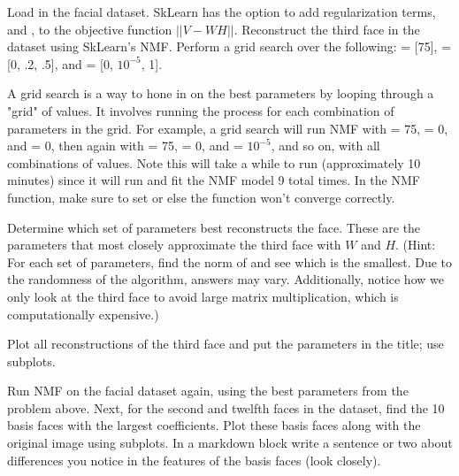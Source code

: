 \begin{problem}
Load in the facial dataset.
SkLearn has the option to add regularization terms,  and , to the objective function $||V-WH||$.
Reconstruct the third face in the dataset using SkLearn's NMF.
 Perform a grid search over the following:
 =  [75],  = [0, .2, .5], and  = [0, $10^{-5}$, 1]. 

A grid search is a way to hone in on the best parameters by looping through a "grid" of values. It involves running the process for each combination of parameters in the grid. For example, a grid search will run NMF with  =  75,  = 0, and  = 0, then again with   =  75,  = 0, and  =  $10^{-5}$, and so on, with all combinations of values. Note this will take a while to run (approximately 10 minutes) since it will run and fit the NMF model 9 total times. In the NMF function, make sure to set  or else the function won't converge correctly.

Determine which set of parameters best reconstructs the face. These are the parameters that most closely approximate the third face with $W$ and $H$. (Hint: For each set of parameters, find the norm of  and see which is the smallest. Due to the randomness of the algorithm, answers may vary. Additionally, notice how we only look at the third face to avoid large matrix multiplication, which is computationally expensive.)

Plot all reconstructions of the third face and put the parameters in the title; use subplots.
\end{problem}

\begin{problem}
Run NMF on the facial dataset again, using the best parameters from the problem above.
Next, for the second and twelfth faces in the dataset, find the 10 basis faces with the largest coefficients. 
Plot these basis faces along with the original image using subplots.
In a markdown block write a sentence or two about differences you notice in the features of the basis faces (look closely).
\end{problem}
